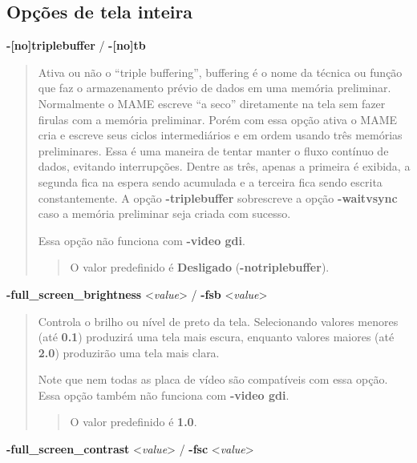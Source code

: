 \documentclass[letterpaper,10pt,brazil]{sphinxmanual}
\begin{document}
\subsection{Opções de tela inteira}
\label{commandline/windowsconfig:opcoes-de-tela-inteira}\label{commandline/windowsconfig:mame-wcommandline-triplebuffer}
\textbf{-{[}no{]}triplebuffer} / \textbf{-{[}no{]}tb}
\begin{quote}

Ativa ou não o ``triple buffering'', buffering é o nome da técnica ou
função que faz o armazenamento prévio de dados em uma memória
preliminar. Normalmente o MAME escreve ``a seco'' diretamente na tela
sem fazer firulas com a memória preliminar. Porém com essa opção
ativa o MAME cria e escreve seus ciclos intermediários e em ordem
usando três memórias preliminares. Essa é uma maneira de tentar
manter o fluxo contínuo de dados, evitando interrupções. Dentre as
três, apenas a primeira é exibida, a segunda fica na espera sendo
acumulada e a terceira fica sendo escrita constantemente.
A opção \textbf{-triplebuffer} sobrescreve a opção \textbf{-waitvsync} caso a
memória preliminar seja criada com sucesso.

Essa opção não funciona com \textbf{-video gdi}.
\begin{quote}

O valor predefinido é \textbf{Desligado} (\textbf{-notriplebuffer}).
\end{quote}
\end{quote}
\label{commandline/windowsconfig:mame-wcommandline-fullscreenbrightness}
\textbf{-full\_screen\_brightness} \textless{}\emph{value}\textgreater{} / \textbf{-fsb} \textless{}\emph{value}\textgreater{}
\begin{quote}

Controla o brilho ou nível de preto da tela.
Selecionando valores menores (até \textbf{0.1}) produzirá uma tela mais
escura, enquanto valores maiores (até \textbf{2.0}) produzirão uma tela
mais clara.

Note que nem todas as placa de vídeo são compatíveis com essa opção.
Essa opção também não funciona com \textbf{-video gdi}.
\begin{quote}

O valor predefinido é \textbf{1.0}.
\end{quote}
\end{quote}
\label{commandline/windowsconfig:mame-wcommandline-fullscreencontrast}
\textbf{-full\_screen\_contrast} \textless{}\emph{value}\textgreater{} / \textbf{-fsc} \textless{}\emph{value}\textgreater{}
\end{document}
